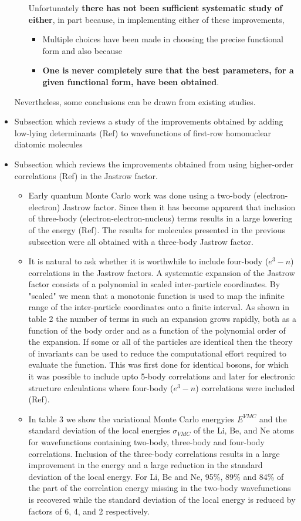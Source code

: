 \documentclass[twoside,english]{uiofysmaster}
\begin{document}
\begin{itemize}
\begin{itemize}
\begin{itemize}
		\end{itemize}
		Unfortunately \textbf{there has not been sufficient systematic study of either}, in part because, in implementing either of these improvements, 
		\begin{itemize}
			\item Multiple choices have been made in choosing the precise functional form and also because
			\item \textbf{One is never completely sure that the best parameters, for a given functional form, have been obtained}.
		\end{itemize}
	\end{itemize}
	Nevertheless, some conclusions can be drawn from existing studies.
	\item Subsection which reviews a study of the improvements obtained by adding low-lying determinants (Ref) to wavefunctions of first-row homonuclear diatomic molecules 
	\item Subsection which reviews the improvements obtained from using higher-order correlations (Ref) in the Jastrow factor.
	\begin{itemize}
		\item Early quantum Monte Carlo work was done using a two-body (electron-electron) Jastrow factor. Since then it has become apparent that inclusion of three-body (electron-electron-nucleus) terms results in a large lowering of the energy (Ref). The results for molecules presented in the previous subsection were all obtained with a three-body Jastrow factor. 
		\item It is natural to ask whether it is worthwhile to include four-body ($e^3-n$) correlations in the Jastrow factors. A systematic expansion of the Jastrow factor consists of a polynomial in scaled inter-particle coordinates. By "scaled" we mean that a monotonic function is used to map the infinite range of the inter-particle coordinates onto a finite interval. As shown in table 2 the number of terms in such an expansion grows rapidly, both as a function of the body order and as a function of the polynomial order of the expansion. If some or all of the particles are identical then the theory of invariants can be used to reduce the computational effort required to evaluate the function. This was first done for identical bosons, for which it was possible to include upto 5-body correlations \cite{Huang1997} and later for electronic structure calculations where four-body ($e^3-n$) correlations were included (Ref).
		\item In table 3 we show the variational Monte Carlo energyies $E^{VMC}$ and the standard deviation of the local energies $\sigma_{VMC}$ of the Li, Be, and Ne atoms for wavefunctions containing two-body, three-body and four-body correlations. Inclusion of the three-body correlations results in a large improvement in the energy and a large reduction in the standard deviation of the local energy. For Li, Be and Ne, 95\%, 89\% and 84\% of the part of the correlation energy missing in the two-body wavefunctions is recovered while the standard deviation of the local energy is reduced by factors of 6, 4, and 2 respectively. 

\end{itemize}
\end{itemize}
\end{document}
